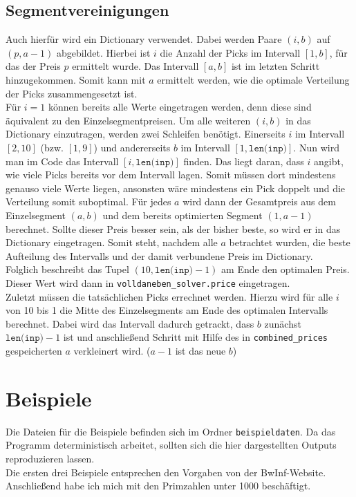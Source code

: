 \documentclass[a4paper,10pt,ngerman]{scrartcl}
\begin{document}
\subsection{Segmentvereinigungen}
Auch hierf\"ur wird ein Dictionary verwendet. Dabei werden Paare $(i, b)$
auf $(p, a-1)$ abgebildet. Hierbei ist $i$ die Anzahl der Picks im Intervall
$[1, b]$, f\"ur das der Preis $p$ ermittelt wurde. Das Intervall $[a, b]$
ist im letzten Schritt hinzugekommen. Somit kann mit $a$ ermittelt werden,
wie die optimale Verteilung der Picks zusammengesetzt ist.\\
\indent F\"ur $i=1$ k\"onnen bereits alle Werte eingetragen werden, denn
diese sind \"aquivalent zu den Einzelsegmentpreisen. 
Um alle weiteren $(i, b)$ in das Dictionary einzutragen, werden zwei Schleifen
ben\"otigt. Einerseits $i$ im Intervall $[2, 10]$ (bzw. $[1, 9]$) und andererseits
$b$ im Intervall $[1, \texttt{len(inp)}]$. Nun wird man im Code das Intervall
$[i, \texttt{len(inp)}]$ finden. Das liegt daran, dass $i$ angibt, wie viele
Picks bereits vor dem Intervall lagen. Somit m\"ussen dort mindestens
genauso viele Werte liegen, ansonsten w\"are mindestens ein Pick doppelt und
die Verteilung somit suboptimal. F\"ur jedes $a$ wird dann der Gesamtpreis
aus dem Einzelsegment $(a, b)$ und dem bereits optimierten Segment $(1, a-1)$
berechnet. Sollte dieser Preis besser sein, als der bisher beste, so
wird er in das Dictionary eingetragen. Somit steht, nachdem alle $a$ betrachtet
wurden, die beste Aufteilung des Intervalls und der damit verbundene Preis
im Dictionary.\\
\indent Folglich beschreibt das Tupel $(10, \texttt{len(inp)}-1)$ am Ende den optimalen
Preis. Dieser Wert wird dann in \texttt{volldaneben\_solver.price} eingetragen.\\
\indent Zuletzt m\"ussen die tats\"achlichen Picks errechnet werden.
Hierzu wird f\"ur alle $i$ von 10 bis 1 die Mitte des Einzelsegments am
Ende des optimalen Intervalls berechnet. Dabei wird das Intervall dadurch
getrackt, dass $b$ zun\"achst $\texttt{len(inp)}-1$ ist und anschlie\ss end
Schritt mit Hilfe des in \texttt{combined\_prices} gespeicherten $a$
verkleinert wird. ($a-1$ ist das neue $b$)
\section{Beispiele}
Die Dateien f\"ur die Beispiele befinden sich im Ordner \texttt{beispieldaten}.
Da das Programm deterministisch arbeitet, sollten sich die hier dargestellten
Outputs reproduzieren lassen.\\
\indent Die ersten drei Beispiele entsprechen den Vorgaben von der
BwInf-Website. Anschlie\ss end habe ich mich mit den Primzahlen
unter 1000 besch\"aftigt.
\end{document}
